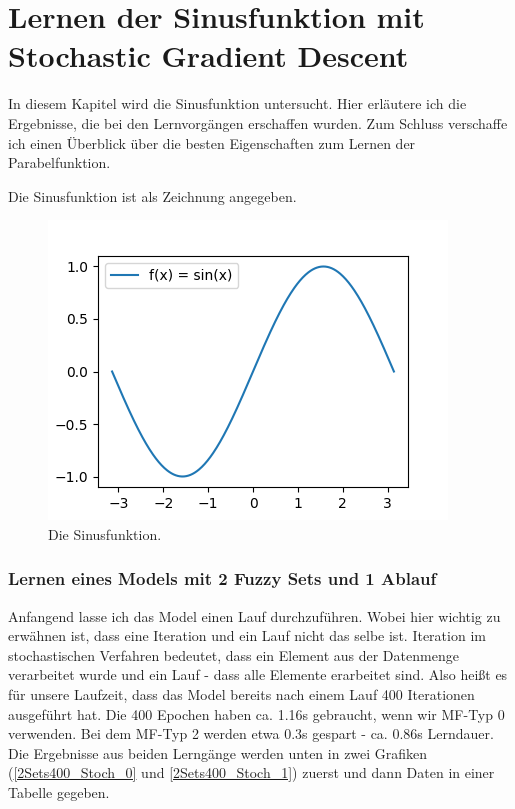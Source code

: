\section{Lernen der Sinusfunktion mit Stochastic Gradient Descent}
In diesem Kapitel wird die Sinusfunktion untersucht. Hier erläutere ich die Ergebnisse, die bei den Lernvorgängen erschaffen wurden. Zum Schluss verschaffe ich einen Überblick über die besten Eigenschaften zum Lernen der Parabelfunktion.

Die Sinusfunktion ist als Zeichnung angegeben.

\begin{figure}
	\centering
	\includegraphics{images/sinus.png}
	\caption{Die  Sinusfunktion.}
\end{figure} 

\subsubsection{Lernen eines Models mit 2 Fuzzy Sets und 1 Ablauf}

Anfangend lasse ich das Model einen Lauf durchzuführen. Wobei hier wichtig zu erwähnen ist, dass eine Iteration und ein Lauf nicht das selbe ist. Iteration im stochastischen Verfahren bedeutet, dass ein Element aus der Datenmenge verarbeitet wurde und ein Lauf - dass alle Elemente erarbeitet sind. Also heißt es für unsere Laufzeit, dass das Model bereits nach einem Lauf 400 Iterationen ausgeführt hat. Die 400 Epochen haben ca. 1.16s gebraucht, wenn wir MF-Typ 0 verwenden. Bei dem MF-Typ 2 werden etwa 0.3s gespart - ca. 0.86s Lerndauer. Die Ergebnisse aus beiden Lerngänge werden unten in zwei Grafiken (\ref{2Sets400_Stoch_0} und \ref{2Sets400_Stoch_1}) zuerst und dann Daten in einer Tabelle gegeben.

